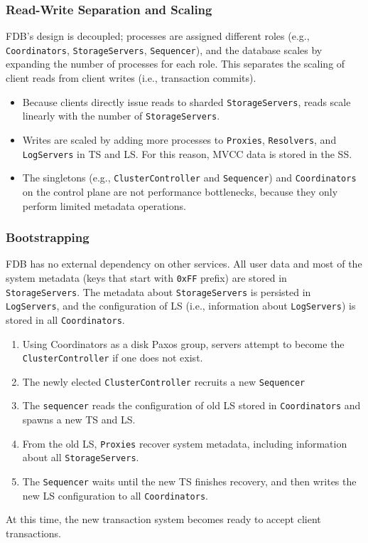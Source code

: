 \documentclass[11pt]{article}
\begin{document}
\subsubsection{Read-Write Separation and Scaling}
\label{sec:org2211a22}
FDB’s design is decoupled; processes are assigned different roles (e.g., \texttt{Coordinators}, \texttt{StorageServers},
\texttt{Sequencer}), and the database scales by expanding the number of processes for each role. This separates
the scaling of client reads from client writes (i.e., transaction commits).
\begin{itemize}
\item Because clients directly issue reads to sharded \texttt{StorageServers}, reads scale linearly with the number of \texttt{StorageServers}.
\item Writes are scaled by adding more processes to \texttt{Proxies}, \texttt{Resolvers}, and \texttt{LogServers} in TS and LS. For
this reason, MVCC data is stored in the SS.
\item The singletons (e.g., \texttt{ClusterController} and \texttt{Sequencer}) and \texttt{Coordinators} on the control plane are not
performance bottlenecks, because they only perform limited metadata operations.
\end{itemize}
\subsubsection{Bootstrapping}
\label{sec:org376ebb4}
FDB has no external dependency on other services. All user data and most of the system metadata (keys
that start with \texttt{0xFF} prefix) are stored in \texttt{StorageServers}. The metadata about \texttt{StorageServers} is
persisted in \texttt{LogServers}, and the configuration of LS (i.e., information about \texttt{LogServers}) is stored in
all \texttt{Coordinators}.
\begin{enumerate}
\item Using Coordinators as a disk Paxos group, servers attempt to become the \texttt{ClusterController} if one
does not exist.
\item The newly elected \texttt{ClusterController} recruits a new \texttt{Sequencer}
\item The \texttt{sequencer} reads the configuration of old LS stored in \texttt{Coordinators} and spawns a new TS and LS.
\item From the old LS, \texttt{Proxies} recover system metadata, including information about all \texttt{StorageServers}.
\item The \texttt{Sequencer} waits until the new TS finishes recovery, and then writes the new LS configuration to
all \texttt{Coordinators}.
\end{enumerate}
At this time, the new transaction system becomes ready to accept client transactions.
\end{document}
